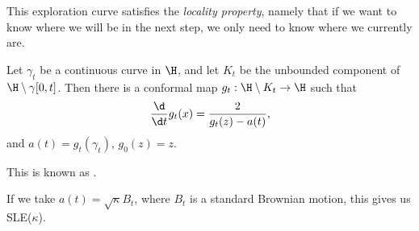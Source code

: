 \documentclass[a4paper]{article}
\begin{document}
This exploration curve satisfies the \emph{locality property}, namely that if we want to know where we will be in the next step, we only need to know where we currently are.

Let $\gamma_t$ be a continuous curve in $\H$, and let $K_t$ be the unbounded component of $\H \setminus \gamma [0, t]$. Then there is a conformal map $g_t: \H \setminus K_t \to \H$ such that
\[
  \frac{\d}{\d t} g_t(x) = \frac{2}{g_t(z) - a(t)},
\]
and $a(t) = g_t(\gamma_t)$, $g_0(z) = z$.

This is known as .

If we take $a(t) = \sqrt{\kappa} B_t$, where $B_t$ is a standard Brownian motion, this gives us SLE($\kappa$).

\printindex
\end{document}
